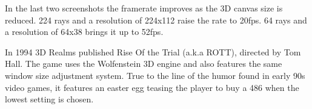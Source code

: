    \begin{figure}[H]
\centering
 \end{figure}
 \par
 In the last two screenshots the framerate improves as the 3D canvas size is reduced. 224 rays and a resolution of 224x112 raise the rate to 20fps. 64 rays and a resolution of 64x38 brings it up to 52fps.\\
 \par
{} In 1994 3D Realms published Rise Of the Trial (a.k.a ROTT), directed by Tom Hall. The game uses the Wolfenstein 3D engine and also features the same window size adjustment system. True to the line of the humor found in early 90s video games, it features an easter egg teasing the player to buy a 486 when the lowest setting is chosen.
    \begin{figure}[H]
\centering
 \end{figure}
 \par
